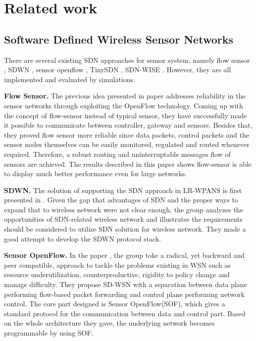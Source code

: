 \section{Related work}

\subsection{Software Defined Wireless Sensor Networks}


There are several existing SDN approaches for sensor system, 
namely flow sensor \cite{mahmud2011exploitation}, SDWN \cite{costanzo2012software},
sensor openflow \cite{luo2012sensor}, TinySDN \cite{de2015tinysdn}, SDN-WISE \cite{galluccio2015sdn}.
However, they are all implemented and evaluated by simulations. 

\textbf{Flow Sensor.}
The previous idea presented in paper \cite{mahmud2011exploitation} addresses reliability in the sensor networks through exploiting the OpenFlow technology. Coming up with the concept of flow-sensor instead of typical sensor, they have successfully made it possible to communicate between controller, gateway and sensors. Besides that, they proved flow sensor more reliable since data packets, control packets and the sensor nodes themselves can be easily monitored, regulated and routed whenever required. Therefore, a robust routing and uninterruptable messages flow of sensors are achieved. The results described in this paper shows flow-sensor is able to display much better performance even for large networks.

\textbf{SDWN.}
The solution of supporting the SDN approach in LR-WPANS is first presented in \cite{costanzo2012software}. Given the gap that advantages of SDN and the proper ways to expand that to wireless network were not clear enough, the group analyzes the opportunities of SDN-related wireless network and illustrates the requirements should be considered to utilize SDN solution for wireless network. They made a good attempt to develop the SDWN protocol stack.

\textbf{Sensor OpenFlow.}
In the paper \cite{luo2012sensor}, the group toke a radical, yet backward and peer compatible, approach to tackle the problems existing in WSN such as resource underutilization, counterproductive, rigidity to policy change and manage difficulty. They propose SD-WSN with a separation between data plane performing flow-based packet forwarding and control plane performing network control. The core part designed is Sensor OpenFlow(SOF), which gives a standard protocol for the communication between data and control part. Based on the whole architecture they gave, the underlying network becomes programmable by using SOF.

